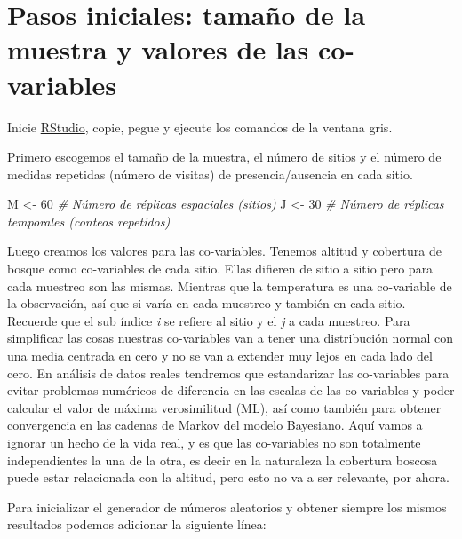 \documentclass[
]{book}
\newenvironment{Shaded}{\begin{snugshade}}{\end{snugshade}}
\newcommand{\CommentTok}[1]{\textcolor[rgb]{0.56,0.35,0.01}{\textit{#1}}}
\newcommand{\DecValTok}[1]{\textcolor[rgb]{0.00,0.00,0.81}{#1}}
\newcommand{\NormalTok}[1]{#1}
\newcommand{\StringTok}[1]{\textcolor[rgb]{0.31,0.60,0.02}{#1}}
\begin{document}
\hypertarget{pasos-iniciales-tamauxf1o-de-la-muestra-y-valores-de-las-co-variables}{%
\section{Pasos iniciales: tamaño de la muestra y valores de las co-variables}\label{pasos-iniciales-tamauxf1o-de-la-muestra-y-valores-de-las-co-variables}}

Inicie \href{http://www.rstudio.com/}{RStudio}, copie, pegue y ejecute los comandos de la ventana gris.

Primero escogemos el tamaño de la muestra, el número de sitios y el número de medidas repetidas (número de visitas) de presencia/ausencia en cada sitio.

\begin{Shaded}
\begin{Highlighting}[]
\NormalTok{M <-}\StringTok{ }\DecValTok{60}  \CommentTok{# Número de réplicas espaciales (sitios)}
\NormalTok{J <-}\StringTok{ }\DecValTok{30}  \CommentTok{# Número de réplicas temporales (conteos repetidos)}
\end{Highlighting}
\end{Shaded}

Luego creamos los valores para las co-variables. Tenemos altitud y cobertura de bosque como co-variables de cada sitio. Ellas difieren de sitio a sitio pero para cada muestreo son las mismas. Mientras que la temperatura es una co-variable de la observación, así que si varía en cada muestreo y también en cada sitio. Recuerde que el sub índice \emph{i} se refiere al sitio y el \emph{j} a cada muestreo. Para simplificar las cosas nuestras co-variables van a tener una distribución normal con una media centrada en cero y no se van a extender muy lejos en cada lado del cero. En análisis de datos reales tendremos que estandarizar las co-variables para evitar problemas numéricos de diferencia en las escalas de las co-variables y poder calcular el valor de máxima verosimilitud (ML), así como también para obtener convergencia en las cadenas de Markov del modelo Bayesiano. Aquí vamos a ignorar un hecho de la vida real, y es que las co-variables no son totalmente independientes la una de la otra, es decir en la naturaleza la cobertura boscosa puede estar relacionada con la altitud, pero esto no va a ser relevante, por ahora.

Para inicializar el generador de números aleatorios y obtener siempre los mismos resultados podemos adicionar la siguiente línea:
\end{document}
